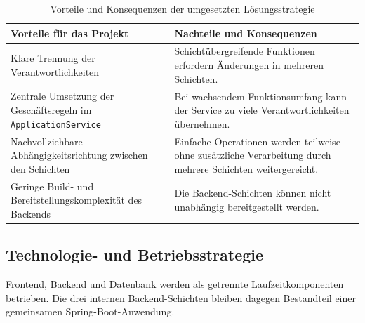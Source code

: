 \documentclass[a4paper,11pt]{article}
\begin{document}
\vspace{0.2cm}

\begin{table}[H]
\centering
\begin{tabularx}{\textwidth}{Y Y}
\toprule
\textbf{Vorteile für das Projekt} & \textbf{Nachteile und Konsequenzen} \\
\midrule

Klare Trennung der Verantwortlichkeiten &
Schichtübergreifende Funktionen erfordern Änderungen in mehreren Schichten. \\

Zentrale Umsetzung der Geschäftsregeln im \texttt{ApplicationService} &
Bei wachsendem Funktionsumfang kann der Service zu viele Verantwortlichkeiten übernehmen. \\

Nachvollziehbare Abhängigkeitsrichtung zwischen den Schichten &
Einfache Operationen werden teilweise ohne zusätzliche Verarbeitung durch mehrere Schichten weitergereicht. \\

Geringe Build- und Bereitstellungskomplexität des Backends &
Die Backend-Schichten können nicht unabhängig bereitgestellt werden. \\

\bottomrule
\end{tabularx}
\caption{Vorteile und Konsequenzen der umgesetzten Lösungsstrategie}
\label{tab:layered-tradeoffs}
\end{table}


\subsection{Technologie- und Betriebsstrategie}

Frontend, Backend und Datenbank werden als getrennte Laufzeitkomponenten betrieben.
Die drei internen Backend-Schichten bleiben dagegen Bestandteil einer gemeinsamen Spring-Boot-Anwendung.

\vspace{0.2cm}
\end{document}
